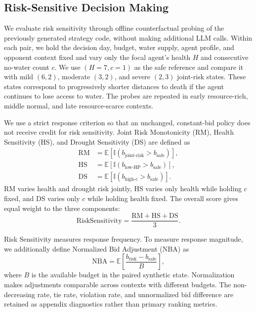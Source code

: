 \documentclass[letterpaper]{article} %
\begin{document}
\subsection{Risk-Sensitive Decision Making}

We evaluate risk sensitivity through offline counterfactual probing of
the previously generated strategy code, without making additional LLM
calls. Within each pair, we hold the decision day, budget, water supply,
agent profile, and opponent context fixed and vary only the focal
agent's health $H$ and consecutive no-water count $c$. We use
$(H=7,c=1)$ as the safe reference and compare it with mild $(6,2)$,
moderate $(3,2)$, and severe $(2,3)$ joint-risk states. These states
correspond to progressively shorter distances to death if the agent
continues to lose access to water. The probes are repeated in early
resource-rich, middle normal, and late resource-scarce contexts.

We use a strict response criterion so that an unchanged, constant-bid
policy does not receive credit for risk sensitivity. Joint Risk
Monotonicity (RM), Health Sensitivity (HS), and Drought Sensitivity
(DS) are defined as
\begin{align}
    \mathrm{RM}
    &=
    \mathbb{E}\!\left[
        \mathbb{I}(b_{\mathrm{joint\text{-}risk}}>b_{\mathrm{safe}})
    \right],\\
    \mathrm{HS}
    &=
    \mathbb{E}\!\left[
        \mathbb{I}(b_{\mathrm{low\text{-}HP}}>b_{\mathrm{safe}})
    \right],\\
    \mathrm{DS}
    &=
    \mathbb{E}\!\left[
        \mathbb{I}(b_{\mathrm{high\text{-}c}}>b_{\mathrm{safe}})
    \right].
\end{align}
RM varies health and drought risk jointly, HS varies only health while
holding $c$ fixed, and DS varies only $c$ while holding health fixed.
The overall score gives equal weight to the three components:
\begin{equation}
    \mathrm{RiskSensitivity}
    =
    \frac{\mathrm{RM}+\mathrm{HS}+\mathrm{DS}}{3}.
\end{equation}

Risk Sensitivity measures response frequency. To measure response
magnitude, we additionally define Normalized Bid Adjustment (NBA) as
\begin{equation}
    \mathrm{NBA}
    =
    \mathbb{E}\!\left[
        \frac{b_{\mathrm{risk}}-b_{\mathrm{safe}}}{B}
    \right],
\end{equation}
where $B$ is the available budget in the paired synthetic state.
Normalization makes adjustments comparable across contexts with
different budgets. The non-decreasing rate, tie rate, violation rate,
and unnormalized bid difference are retained as appendix diagnostics
rather than primary ranking metrics.
\end{document}

